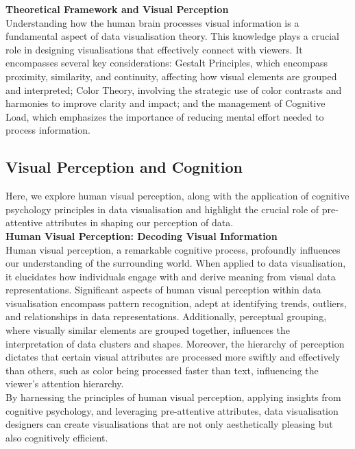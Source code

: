 \documentclass{article}\usepackage[]{graphicx}\usepackage[]{xcolor}
\begin{document}
\noindent \textbf{Theoretical Framework and Visual Perception}\\
Understanding how the human brain processes visual information is a fundamental aspect of data visualisation theory. This knowledge plays a crucial role in designing visualisations that effectively connect with viewers. It encompasses several key considerations: Gestalt Principles, which encompass proximity, similarity, and continuity, affecting how visual elements are grouped and interpreted; Color Theory, involving the strategic use of color contrasts and harmonies to improve clarity and impact; and the management of Cognitive Load, which emphasizes the importance of reducing mental effort needed to process information.\\

\subsection{Visual Perception and Cognition}
Here, we explore human visual perception, along with the application of cognitive psychology principles in data visualisation and highlight the crucial role of pre-attentive attributes in shaping our perception of data.\\ 

\noindent \textbf{Human Visual Perception: Decoding Visual Information}\\
Human visual perception, a remarkable cognitive process, profoundly influences our understanding of the surrounding world. When applied to data visualisation, it elucidates how individuals engage with and derive meaning from visual data representations. Significant aspects of human visual perception within data visualisation encompass pattern recognition, adept at identifying trends, outliers, and relationships in data representations. Additionally, perceptual grouping, where visually similar elements are grouped together, influences the interpretation of data clusters and shapes. Moreover, the hierarchy of perception dictates that certain visual attributes are processed more swiftly and effectively than others, such as color being processed faster than text, influencing the viewer's attention hierarchy.\\

By harnessing the principles of human visual perception, applying insights from cognitive psychology, and leveraging pre-attentive attributes, data visualisation designers can create visualisations that are not only aesthetically pleasing but also cognitively efficient.	
\end{document}
